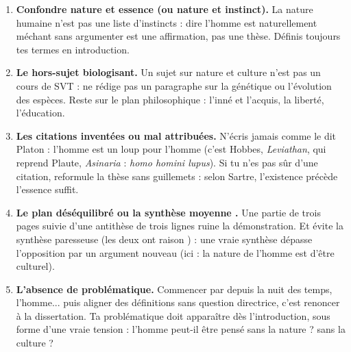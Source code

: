 \documentclass[11pt]{article}
\begin{document}
\begin{attention}
\begin{enumerate}
\item \textbf{Confondre nature et essence (ou nature et instinct).} La nature humaine n'est pas une liste d'instincts : dire \guillemotleft l'homme est naturellement méchant \guillemotright sans argumenter est une affirmation, pas une thèse. Définis toujours tes termes en introduction.
\item \textbf{Le hors-sujet biologisant.} Un sujet sur nature et culture n'est pas un cours de SVT : ne rédige pas un paragraphe sur la génétique ou l'évolution des espèces. Reste sur le plan philosophique : l'inné et l'acquis, la liberté, l'éducation.
\item \textbf{Les citations inventées ou mal attribuées.} N'écris jamais \guillemotleft comme le dit Platon : l'homme est un loup pour l'homme \guillemotright (c'est Hobbes, \emph{Leviathan}, qui reprend Plaute, \emph{Asinaria} : \emph{homo homini lupus}). Si tu n'es pas sûr d'une citation, reformule la thèse sans guillemets : \guillemotleft selon Sartre, l'existence précède l'essence \guillemotright suffit.
\item \textbf{Le plan déséquilibré ou la synthèse \guillemotleft moyenne \guillemotright.} Une partie de trois pages suivie d'une antithèse de trois lignes ruine la démonstration. Et évite la synthèse paresseuse (\guillemotleft les deux ont raison \guillemotright) : une vraie synthèse dépasse l'opposition par un argument nouveau (ici : la nature de l'homme est d'être culturel).
\item \textbf{L'absence de problématique.} Commencer par \guillemotleft depuis la nuit des temps, l'homme... \guillemotright puis aligner des définitions sans question directrice, c'est renoncer à la dissertation. Ta problématique doit apparaître dès l'introduction, sous forme d'une vraie tension : l'homme peut-il être pensé sans la nature ? sans la culture ?
\end{enumerate}
\end{attention}
\end{document}
